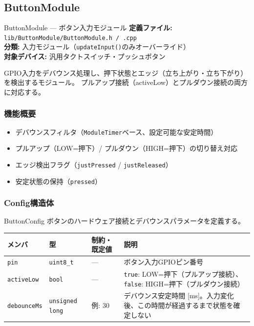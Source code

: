 \subsection{ButtonModule}

\begin{apibox}{ButtonModule --- ボタン入力モジュール}
\textbf{定義ファイル:} \texttt{lib/ButtonModule/ButtonModule.h / .cpp}\\
\textbf{分類:} 入力モジュール（\texttt{updateInput()}のみオーバーライド）\\
\textbf{対象デバイス:} 汎用タクトスイッチ・プッシュボタン

GPIO入力をデバウンス処理し、押下状態とエッジ（立ち上がり・立ち下がり）を検出するモジュール。
プルアップ接続（activeLow）とプルダウン接続の両方に対応する。
\end{apibox}

\subsubsection{機能概要}

\begin{itemize}
    \item デバウンスフィルタ（\texttt{ModuleTimer}ベース、設定可能な安定時間）
    \item プルアップ（LOW=押下）/ プルダウン（HIGH=押下）の切り替え対応
    \item エッジ検出フラグ（\texttt{justPressed} / \texttt{justReleased}）
    \item 安定状態の保持（\texttt{pressed}）
\end{itemize}

\subsubsection{Config構造体}

\begin{funcblock}{ButtonConfig}
ボタンのハードウェア接続とデバウンスパラメータを定義する。

\begin{longtable}{l l l p{5.2cm}}
\toprule
\textbf{メンバ} & \textbf{型} & \textbf{制約・既定値} & \textbf{説明} \\
\midrule
\endhead
\texttt{pin}        & \texttt{uint8\_t}       & ---          & ボタン入力GPIOピン番号 \\
\texttt{activeLow}  & \texttt{bool}           & ---          & \texttt{true}: LOW=押下（プルアップ接続）、\texttt{false}: HIGH=押下（プルダウン接続） \\
\texttt{debounceMs} & \texttt{unsigned long}  & 例: 30       & デバウンス安定時間 [ms]。入力変化後、この時間が経過するまで状態を確定しない \\
\bottomrule
\end{longtable}
\end{funcblock}

